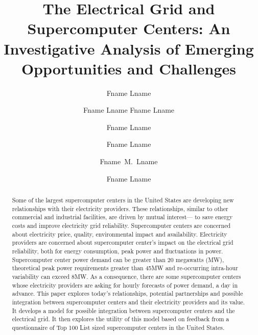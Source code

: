 \documentclass{llncs}
\begin{document}
%
\frontmatter          %
%
\pagestyle{headings}  %
%
%
\mainmatter              %
%
\title{
The Electrical Grid and Supercomputer Centers:  
An Investigative Analysis of Emerging Opportunities and Challenges
}

%
%
%
\author{Fname Lname \and Fname Lname
Fname Lname \and Fname Lname \and Fname Lname \and Fname~M.~Lname \and
Fname Lname}
%
%
%

\maketitle              %

\begin{abstract}
Some of the largest supercomputer centers in the United 
States are developing new relationships with their 
electricity providers.  These relationships, similar to other commercial 
and industrial facilities, are driven by mutual interest— to save energy 
costs and improve electricity grid reliability.  Supercomputer centers are concerned about 
electricity price, quality, environmental impact and 
availability. Electricity providers are concerned about 
supercomputer center's impact on the electrical grid reliability, both 
for energy consumption, peak power and fluctuations in 
power. Supercomputer center power demand can be greater 
than 20 megawatts (MW), theoretical peak power requirements 
greater than 45MW and re-occurring intra-hour variability 
can exceed 8MW. As a consequence, there are some 
supercomputer centers whose electricity providers are 
asking for hourly forecasts of power demand, a day in 
advance.   This paper explores today's relationships, 
potential partnerships and possible integration between 
supercomputer centers and their electricity providers and its value. It 
develops a model for possible integration between 
supercomputer centers and the electrical grid. It then 
explores the utility of this model based on feedback from a 
questionnaire of Top 100 List sized supercomputer centers 
in the United States.
\end{abstract}
\end{document}

